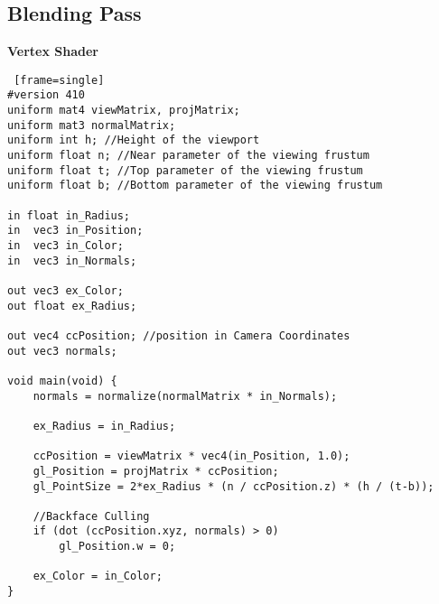 \subsection{Blending Pass}
\textbf{Vertex Shader}
\begin{lstlisting} [frame=single]
#version 410
uniform mat4 viewMatrix, projMatrix;
uniform mat3 normalMatrix;
uniform int h; //Height of the viewport
uniform float n; //Near parameter of the viewing frustum
uniform float t; //Top parameter of the viewing frustum
uniform float b; //Bottom parameter of the viewing frustum

in float in_Radius;
in  vec3 in_Position;
in  vec3 in_Color;
in 	vec3 in_Normals;

out vec3 ex_Color;
out float ex_Radius;

out vec4 ccPosition; //position in Camera Coordinates
out vec3 normals;

void main(void) {
	normals = normalize(normalMatrix * in_Normals);

	ex_Radius = in_Radius;

	ccPosition = viewMatrix * vec4(in_Position, 1.0);
	gl_Position = projMatrix * ccPosition;
	gl_PointSize = 2*ex_Radius * (n / ccPosition.z) * (h / (t-b));

	//Backface Culling
	if (dot (ccPosition.xyz, normals) > 0)
		gl_Position.w = 0;

	ex_Color = in_Color;
}
\end{lstlisting}

